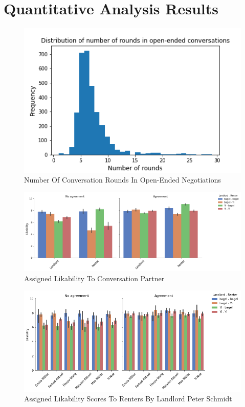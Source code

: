 \documentclass[runningheads]{llncs}
\begin{document}
\newpage

\section{Quantitative Analysis Results}
\begin{figure}[h]
    \includegraphics[width=1\textwidth]{plots/histogram_open-ended.png}
    \caption[eval]{Number Of Conversation Rounds In Open-Ended Negotiations}
    \label{fig:histogramm_rounds}
\end{figure}
\begin{figure}[h]
    \includegraphics[width=1\textwidth]{plots/agreement_likability_bar.png}
    \caption[eval]{Assigned Likability To Conversation Partner}
    \label{fig:agreement_likability}
\end{figure}

\begin{figure}[h]
    \includegraphics[width=1\textwidth]{plots/landlord_assigned_likes_bar_cross_model.png}
    \caption[eval]{Assigned Likability Scores To Renters By Landlord Peter Schmidt}
    \label{fig:agreement_likability_landlord}
\end{figure}
\end{document}
